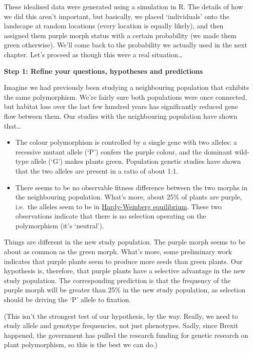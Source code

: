\documentclass[]{book}
\begin{document}
These idealised data were generated using a simulation in R. The details
of how we did this aren't important, but basically, we placed
`individuals' onto the landscape at random locations (every location is
equally likely), and then assigned them purple morph status with a
certain probability (we made them green otherwise). We'll come back to
the probability we actually used in the next chapter. Let's proceed as
though this were a real situation\ldots{}

\textbf{Step 1: Refine your questions, hypotheses and predictions}

Imagine we had previously been studying a neighbouring population that
exhibits the same polymorphism. We're fairly sure both populations were
once connected, but habitat loss over the last few hundred years has
significantly reduced gene flow between them. Our studies with the
neighbouring population have shown that\ldots{}

\begin{itemize}
\item
  The colour polymorphism is controlled by a single gene with two
  alleles: a recessive mutant allele (`P') confers the purple colour,
  and the dominant wild-type allele (`G') makes plants green. Population
  genetic studies have shown that the two alleles are present in a ratio
  of about 1:1.
\item
  There seems to be no observable fitness difference between the two
  morphs in the neighbouring population. What's more, about 25\% of
  plants are purple, i.e.~the alleles seem to be in
  \href{https://en.wikipedia.org/wiki/Hardy–Weinberg_principle}{Hardy-Weinberg
  equilibrium}. These two observations indicate that there is no
  selection operating on the polymorphism (it's `neutral').
\end{itemize}

Things are different in the new study population. The purple morph seems
to be about as common as the green morph. What's more, some preliminary
work indicates that purple plants seem to produce more seeds than green
plants. Our hypothesis is, therefore, that purple plants have a
selective advantage in the new study population. The corresponding
prediction is that the frequency of the purple morph will be greater
than 25\% in the new study population, as selection should be driving
the `P' allele to fixation.

(This isn't the strongest test of our hypothesis, by the way. Really, we
need to study allele and genotype frequencies, not just phenotypes.
Sadly, since Brexit happened, the government has pulled the research
funding for genetic research on plant polymorphism, so this is the best
we can do.)
\end{document}
